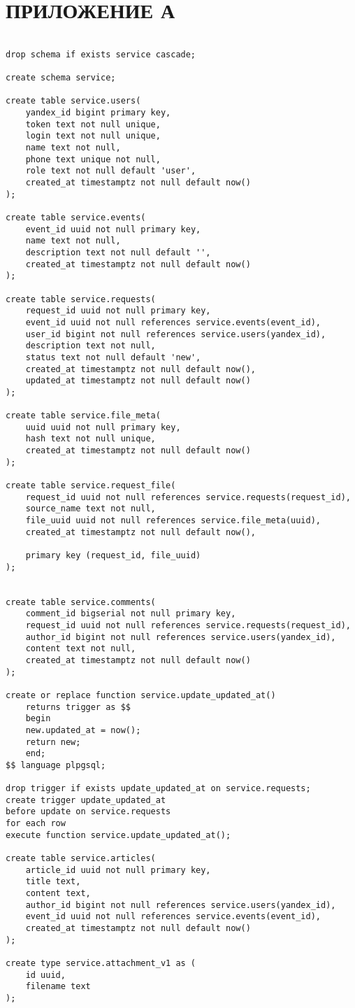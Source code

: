 \section*{ПРИЛОЖЕНИЕ А} \label{ПРИЛОЖЕНИЕ А}

\begin{lstlisting}[label=lst1:schema, caption=Схема базы данных]

drop schema if exists service cascade;

create schema service;

create table service.users(
	yandex_id bigint primary key,
	token text not null unique,
	login text not null unique,
	name text not null,
	phone text unique not null,
	role text not null default 'user',
	created_at timestamptz not null default now()
);

create table service.events(
	event_id uuid not null primary key,
	name text not null,
	description text not null default '',
	created_at timestamptz not null default now()
);

create table service.requests(
	request_id uuid not null primary key,
	event_id uuid not null references service.events(event_id),
	user_id bigint not null references service.users(yandex_id),
	description text not null,
	status text not null default 'new',
	created_at timestamptz not null default now(),
	updated_at timestamptz not null default now()
);

create table service.file_meta(
	uuid uuid not null primary key,
	hash text not null unique,
	created_at timestamptz not null default now()
);

create table service.request_file(
	request_id uuid not null references service.requests(request_id),
	source_name text not null,
	file_uuid uuid not null references service.file_meta(uuid),
	created_at timestamptz not null default now(),
	
	primary key (request_id, file_uuid)
);


create table service.comments(
	comment_id bigserial not null primary key,
	request_id uuid not null references service.requests(request_id),
	author_id bigint not null references service.users(yandex_id),
	content text not null,
	created_at timestamptz not null default now()
);

create or replace function service.update_updated_at()
	returns trigger as $$
	begin
	new.updated_at = now();
	return new;
	end;
$$ language plpgsql;

drop trigger if exists update_updated_at on service.requests;
create trigger update_updated_at
before update on service.requests
for each row
execute function service.update_updated_at();

create table service.articles(
	article_id uuid not null primary key,
	title text,
	content text,
	author_id bigint not null references service.users(yandex_id),
	event_id uuid not null references service.events(event_id),
	created_at timestamptz not null default now()
);

create type service.attachment_v1 as (
	id uuid,
	filename text
);


\end{lstlisting}

\pagebreak
